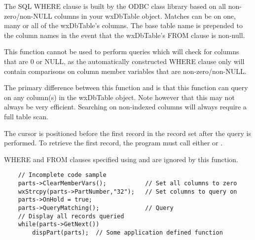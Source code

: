 

The SQL WHERE clause is built by the ODBC class library based on all
non-zero/non-NULL columns in your wxDbTable object.  Matches can be on one,
many or all of the wxDbTable's columns.  The base table name is prepended
to the column names in the event that the wxDbTable's FROM clause is non-null.

This function cannot be used to perform queries which will check for
columns that are 0 or NULL, as the automatically constructed WHERE clause
only will contain comparisons on column member variables that are
non-zero/non-NULL.

The primary difference between this function and 
is that this function can query on any column(s) in the wxDbTable object.
Note however that this may not always be very efficient.  Searching on
non-indexed columns will always require a full table scan.

The cursor is positioned before the first record in the record set after
the query is performed.  To retrieve the first record, the program must call
either  or
.

WHERE and FROM clauses specified using 
and  are ignored by
this function.


\begin{verbatim}
    // Incomplete code sample
    parts->ClearMemberVars();           // Set all columns to zero
    wxStrcpy(parts->PartNumber,"32");   // Set columns to query on
    parts->OnHold = true;
    parts->QueryMatching();             // Query
    // Display all records queried
    while(parts->GetNext())
        dispPart(parts);  // Some application defined function
\end{verbatim}

